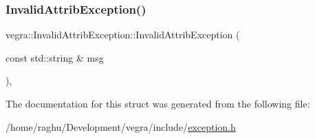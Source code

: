 \subsubsection{\texorpdfstring{Invalid\+Attrib\+Exception()}{InvalidAttribException()}}
{\footnotesize\ttfamily vegra\+::\+Invalid\+Attrib\+Exception\+::\+Invalid\+Attrib\+Exception (\begin{DoxyParamCaption}\item[{const std\+::string \&}]{msg }\end{DoxyParamCaption})\hspace{0.3cm}{\ttfamily [inline]}, {\ttfamily [explicit]}}



The documentation for this struct was generated from the following file\+:\begin{DoxyCompactItemize}
\item 
/home/raghu/\+Development/vegra/include/\mbox{\hyperlink{exception_8h}{exception.\+h}}\end{DoxyCompactItemize}
